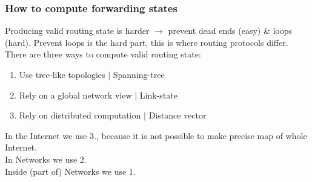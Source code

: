 \documentclass[a4paper, fontsize=8pt, landscape, DIV=1]{scrartcl}
\begin{document}
\begin{multicols*}{4}
			\subsubsection{How to compute forwarding states}
			Producing valid routing state is harder $\rightarrow$ prevent dead ends (easy) \& loops (hard). Prevent loops is the hard part, this is where routing protocols differ. There are three ways to compute valid routing state: 
			\begin{enumerate}[noitemsep]
				\item Use tree-like topologies $\vert$ Spanning-tree
			 	\item Rely on a global network view $\vert$ Link-state
			 	\item Rely on distributed computation $\vert$ Distance vector 
		 	\end{enumerate}
			In the Internet we use 3., because it is not possible to make precise map of whole Internet.\\
			In Networks we use 2.\\
			Inside (part of) Networks we use 1. \par
			

\end{multicols*}
\end{document}
